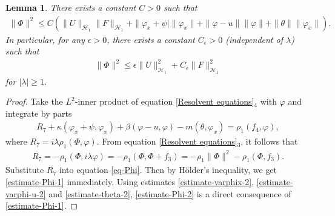 \documentclass[11pt,reqno]{article}
\newtheorem{lemma}[theorem]{Lemma}
\begin{document}
  \begin{lemma}\label{lemma-Phi}
  	There exists a constant $C>0$ such that
  	\begin{align}\label{estimate-Phi-1}
  		\|\Phi\|^2 \leq C(\|U\|_{\mathcal{H}_1}\|F\|_{\mathcal{H}_1}  + \|\varphi_x+\psi|\|\varphi_x\| + \|\varphi-u\|\|\varphi\| + \|\theta\|\|\varphi_x\|).
  	\end{align}
  	In particular, for any $\epsilon>0$, there exists a constant $C_{\epsilon}>0$ (independent of $\lambda$) such that
  	\begin{align}\label{estimate-Phi-2}
  		\|\Phi\|^2 \leq \epsilon\|U\|_{\mathcal{H}_1}^2 + C_{\epsilon}\|F\|_{\mathcal{H}_1}^2
  	\end{align}
  	for $|\lambda| \geq 1$.
  \end{lemma}
  \begin{proof}
  	Take the $L^2$-inner product of equation \eqref{Resolvent equations}$_4$ with $\varphi$ and integrate by parts
  	\begin{align}\label{eq-Phi}
  		R_7 + \kappa (\varphi_x + \psi, \varphi_x) + \beta (\varphi - u, \varphi) - m (\theta, \varphi_x) = \rho_1 (f_4, \varphi),
  	\end{align}
  	where $R_7 = i \lambda \rho_1 (\Phi, \varphi)$. From equation \eqref{Resolvent equations}$_3$, it follows that
  	\begin{align}
  		R_7 = -\rho_1 (\Phi, i \lambda \varphi) = -\rho_1 (\Phi, \Phi + f_3) = -\rho_1 \|\Phi\|^2 - \rho_1 (\Phi, f_3).
  	\end{align}
  	Substitute $R_7$ into equation \eqref{eq-Phi}. Then by H\"older's inequality, we get \eqref{estimate-Phi-1} immediately. Using estimates \eqref{estimate-varphix-2}, \eqref{estimate-varphi-u-2} and \eqref{estimate-theta-2}, \eqref{estimate-Phi-2} is a direct consequence of \eqref{estimate-Phi-1}.
  \end{proof}
\end{document}
